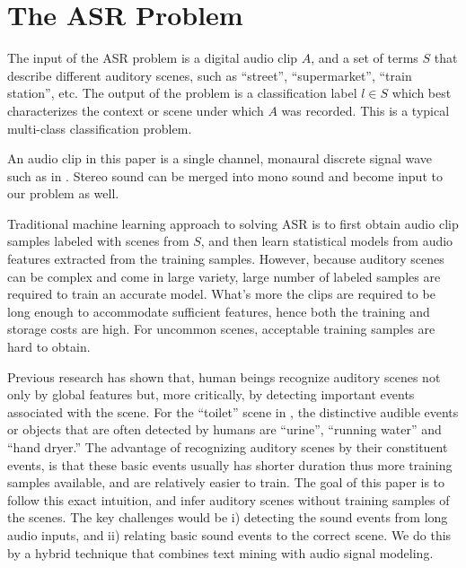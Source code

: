 \section{The ASR Problem}
\label{sec:problem}

%
The input of the ASR problem is a digital audio clip $A$, and a set of terms $S$
that describe different auditory scenes, such as ``street'', ``supermarket'',
``train station'', etc. The output of the problem is a classification
label $l \in S$ which best characterizes the context or scene
under which $A$ was recorded. This is a typical multi-class classification
problem.

An audio clip in this paper is a single channel, monaural discrete signal
wave such as in . Stereo sound can be merged into mono sound and
become input to our problem as well.

Traditional machine learning approach to solving ASR is to first
obtain audio clip samples labeled with scenes from $S$,
and then learn statistical models from audio features extracted from
the training samples. However, because auditory scenes can be complex and
come in large variety, large number of labeled samples are required to train
an accurate model. What's more the clips are required to be long enough to
accommodate sufficient features, hence both the training and storage costs
are high. For uncommon scenes, acceptable training samples are hard to obtain.

Previous research has shown that, human beings recognize auditory scenes
not only by global features but, more critically, by detecting
important events associated with the scene. For the ``toilet'' scene
in , the distinctive audible events or objects that are
often detected by humans are ``urine'', ``running water'' and ``hand dryer.''
The advantage of recognizing auditory scenes by their constituent events,
is that these basic events usually has shorter duration thus more
training samples available, and are relatively easier to train.
The goal of this paper is to
follow this exact intuition, and infer auditory scenes
without training samples of the scenes. The key challenges would be i)
detecting the sound events from long audio inputs, and ii) relating basic
sound events to the correct scene. We do this by a hybrid technique that
combines text mining with audio signal modeling.

